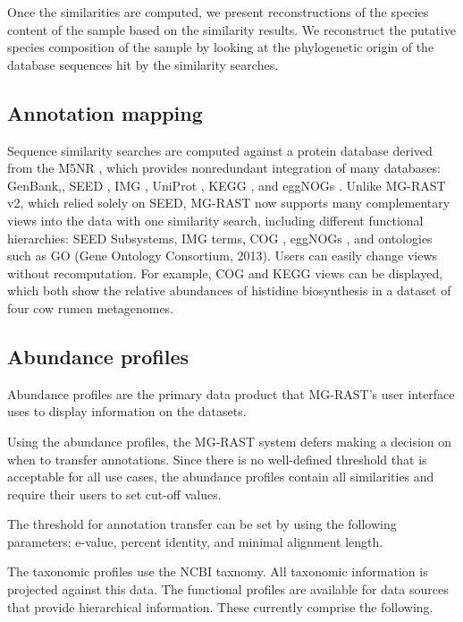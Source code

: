 \documentclass[12pt,fullpage]{report}
\begin{document}
Once the similarities are computed, we present reconstructions of the species content of the sample based on the similarity results. We reconstruct the putative species composition of the sample by looking at the phylogenetic origin of the database sequences hit by the similarity searches.
\subsection{Annotation mapping}
 Sequence similarity searches are computed against a protein database derived from the M5NR \cite{M5NR}, which provides nonredundant integration of many databases: GenBank,\cite{GENBANK}, \gls{SEED} \cite{SUBSYSTEMS}, IMG \cite{IMG}, UniProt \cite{UNIPROT}, KEGG \cite{KEGG}, and eggNOGs \cite{EGGNOG}. Unlike MG-RAST v2, which relied solely on SEED, MG-RAST now supports many complementary views into the data with one similarity search, including different functional hierarchies: SEED \gls{Subsystem}s, IMG terms, COG \cite{COG}, eggNOGs \cite{EGGNOG}, and ontologies such as GO (Gene Ontology Consortium, 2013). Users can easily change views without recomputation. For example, COG and KEGG views can be displayed, which both show the relative abundances of histidine biosynthesis in a dataset of four cow rumen metagenomes.


\subsection{Abundance profiles}

Abundance profiles are the primary data product that MG-RAST's user interface uses to display information on the datasets.

Using the abundance profiles, the MG-RAST system defers making a decision on when to transfer annotations. Since there is no well-defined threshold that is acceptable for all use cases, the abundance profiles contain all similarities and require their users to set cut-off values.

The threshold for annotation transfer can be set by using the following parameters:
e-value,
percent identity, and
minimal alignment length.

The taxonomic profiles use the NCBI taxnomy. All taxonomic information is projected against this data.
The functional profiles are available for data sources that provide hierarchical information. These currently comprise the following.
\end{document}
